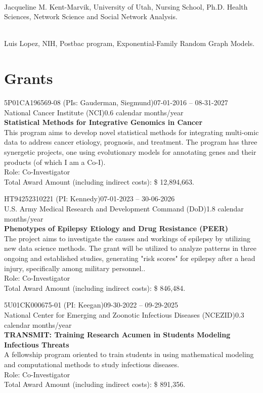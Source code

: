 \documentclass[letterpaper, 10pt]{article}
\renewcommand{\textbf}[1]{{\bfseries\color{teal}#1}}
\begin{document}
\noindent \textbf{Mentor, (2022--Present),}\\ Jacqueline M. Kent-Marvik, University of Utah, Nursing School, Ph.D. Health Sciences, Network Science and Social Network Analysis.\vspace{.5cm}

\noindent \textbf{Mentor, (2022),}\\ Luis Lopez, NIH, Postbac program, Exponential-Family Random Graph Models.

\section*{Grants}

\noindent 5P01CA196569-08 (PIs: Gauderman, Siegmund)\hfill 07-01-2016 -- 08-31-2027\\
National Cancer Institute (NCI)\hfill 0.6 calendar months/year\\
\textbf{Statistical Methods for Integrative Genomics in Cancer}\\
This program aims to develop novel statistical methods for integrating multi-omic data to address cancer etiology, prognosis, and treatment. The program has three synergetic projects, one using evolutionary models for annotating genes and their products (of which I am a Co-I). \\
Role: Co-Investigator\\
Total Award Amount (including indirect costs): \$ 12,894,663. \vspace{.5cm}

\noindent HT94252310221 (PI: Kennedy)\hfill 07-01-2023 -- 30-06-2026\\
U.S. Army Medical Research and Development Command (DoD)\hfill 1.8 calendar months/year\\
\textbf{Phenotypes of Epilepsy Etiology and Drug Resistance (PEER)}\\
The project aims to investigate the causes and workings of epilepsy by utilizing new data science methods. The grant will be utilized to analyze patterns in three ongoing and established studies, generating "risk scores" for epilepsy after a head injury, specifically among military personnel..\\
Role: Co-Investigator\\
Total Award Amount (including indirect costs): \$ 846,484. \vspace{.5cm}

\noindent 5U01CK000675-01 (PI: Keegan)\hfill 09-30-2022 -- 09-29-2025\\
National Center for Emerging and Zoonotic Infectious Diseases (NCEZID)\hfill 0.3 calendar months/year\\
\textbf{TRANSMIT: Training Research Acumen in Students Modeling Infectious Threats}\\
A fellowship program oriented to train students in using mathematical modeling and computational methods to study infectious diseases.\\
Role: Co-Investigator\\
Total Award Amount (including indirect costs): \$ 891,356. \vspace{.5cm}
\end{document}
